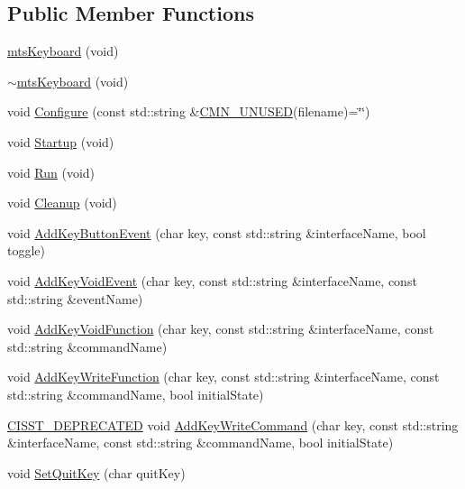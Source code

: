 \subsection*{Public Member Functions}
\begin{DoxyCompactItemize}
\item 
\hyperlink{classmts_keyboard_adcca3e0e99ed2012ada15359d71c9ccf}{mts\-Keyboard} (void)
\item 
\hyperlink{classmts_keyboard_aa2c02ebc887246bf460f1ae17f631558}{$\sim$mts\-Keyboard} (void)
\item 
void \hyperlink{classmts_keyboard_a386a495b739b6a14475c8009c5b63c09}{Configure} (const std\-::string \&\hyperlink{cmn_portability_8h_a021894e2626935fa2305434b1e893ff6}{C\-M\-N\-\_\-\-U\-N\-U\-S\-E\-D}(filename)=\char`\"{}\char`\"{})
\item 
void \hyperlink{classmts_keyboard_a64d7db5165ea2bdd37a422e36eab63cc}{Startup} (void)
\item 
void \hyperlink{classmts_keyboard_ad185c6674e74f5a8a644de354a161cdc}{Run} (void)
\item 
void \hyperlink{classmts_keyboard_a4ae8a0f75d1bf5e641c777373084503f}{Cleanup} (void)
\item 
void \hyperlink{classmts_keyboard_ae5c798cb3f57bdb381e92569c75fdacb}{Add\-Key\-Button\-Event} (char key, const std\-::string \&interface\-Name, bool toggle)
\item 
void \hyperlink{classmts_keyboard_aca2d3dfd032bd898e3d2c96a0662e844}{Add\-Key\-Void\-Event} (char key, const std\-::string \&interface\-Name, const std\-::string \&event\-Name)
\item 
void \hyperlink{classmts_keyboard_ab09848eb354518b5da1ec359c2d7f1c2}{Add\-Key\-Void\-Function} (char key, const std\-::string \&interface\-Name, const std\-::string \&command\-Name)
\item 
void \hyperlink{classmts_keyboard_a4e1820cdb79e96540da19ceb9471a55a}{Add\-Key\-Write\-Function} (char key, const std\-::string \&interface\-Name, const std\-::string \&command\-Name, bool initial\-State)
\item 
\hyperlink{cmn_portability_8h_a63da7164735f9501be651b1f2bbc0121}{C\-I\-S\-S\-T\-\_\-\-D\-E\-P\-R\-E\-C\-A\-T\-E\-D} void \hyperlink{classmts_keyboard_aa515148174d1ee6795f3a9fd16f5cec0}{Add\-Key\-Write\-Command} (char key, const std\-::string \&interface\-Name, const std\-::string \&command\-Name, bool initial\-State)
\item 
void \hyperlink{classmts_keyboard_a9755aad63e2916c5cb7f2c53fc8c1ad2}{Set\-Quit\-Key} (char quit\-Key)
\end{DoxyCompactItemize}
